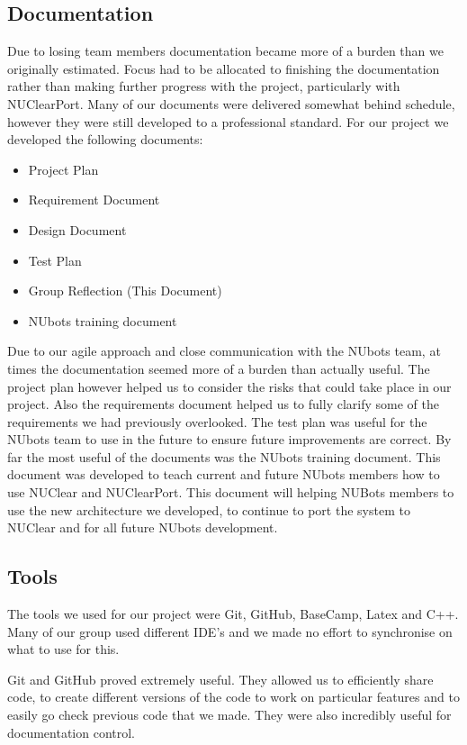 \documentclass[english,12pt]{scrartcl}
\begin{document}
	\subsection{Documentation}
		Due to losing team members documentation became more of a burden than we originally estimated.
		Focus had to be allocated to finishing the documentation rather than making further progress with the project, particularly with NUClearPort.
		Many of our documents were delivered somewhat behind schedule, however they were still developed to a professional standard.
		For our project we developed the following documents:
		\begin{itemize}
			\item Project Plan
			\item Requirement Document
			\item Design Document
			\item Test Plan
			\item Group Reflection (This Document)
			\item NUbots training document
		\end{itemize}
		
		Due to our agile approach and close communication with the NUbots team, at times the documentation seemed more of a burden than actually useful. 
		The project plan however helped us to consider the risks that could take place in our project.
		Also the requirements document helped us to fully clarify some of the requirements we had previously overlooked.
		The test plan was useful for the NUbots team to use in the future to ensure future improvements are correct.
		By far the most useful of the documents was the NUbots training document.
		This document was developed to teach current and future NUbots members how to use NUClear and NUClearPort.
		This document will helping NUBots members to use the new architecture we developed, to continue to port the system to NUClear and for all future NUbots development.

	\subsection{Tools}
		The tools we used for our project were Git, GitHub, BaseCamp, Latex and C++.
		Many of our group used different IDE's and we made no effort to synchronise on what to use for this.

		Git and GitHub proved extremely useful.
		They allowed us to efficiently share code, to create different versions of the code to work on particular features and to easily go check previous code that we made. 
		They were also incredibly useful for documentation control.
\end{document}
